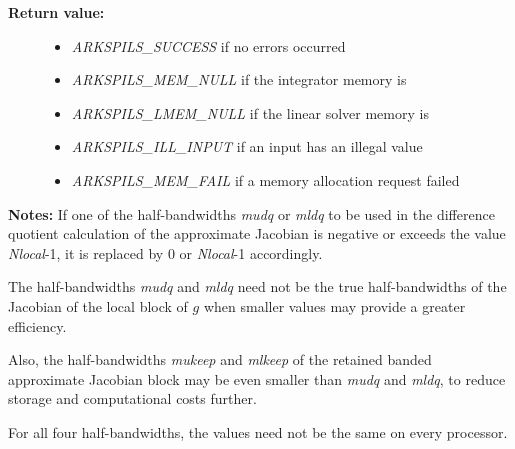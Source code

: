 \documentclass[letterpaper,10pt,english]{sphinxmanual}
\begin{document}
\begin{fulllineitems}
\begin{description}
\begin{itemize}
\end{itemize}

\item[{\textbf{Return value:}}] \leavevmode\begin{itemize}
\item {} 
\emph{ARKSPILS\_SUCCESS} if no errors occurred

\item {} 
\emph{ARKSPILS\_MEM\_NULL} if the integrator memory is 

\item {} 
\emph{ARKSPILS\_LMEM\_NULL} if the linear solver memory is 

\item {} 
\emph{ARKSPILS\_ILL\_INPUT} if an input has an illegal value

\item {} 
\emph{ARKSPILS\_MEM\_FAIL} if a memory allocation request failed

\end{itemize}

\end{description}

\textbf{Notes:}  If one of the half-bandwidths \emph{mudq} or \emph{mldq} to be used
in the difference quotient calculation of the approximate Jacobian is
negative or exceeds the value \emph{Nlocal}-1, it is replaced by 0 or
\emph{Nlocal}-1 accordingly.

The half-bandwidths \emph{mudq} and \emph{mldq} need not be the true
half-bandwidths of the Jacobian of the local block of $g$
when smaller values may provide a greater efficiency.

Also, the half-bandwidths \emph{mukeep} and \emph{mlkeep} of the retained
banded approximate Jacobian block may be even smaller than
\emph{mudq} and \emph{mldq}, to reduce storage and computational costs
further.

For all four half-bandwidths, the values need not be the same on
every processor.

\end{fulllineitems}
\end{document}
